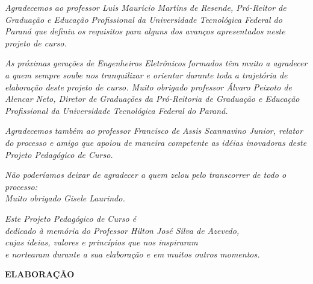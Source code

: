 {\vspace{60mm}

\textit{Agradecemos ao professor \emph{Luis Mauricio Martins de Resende}, Pró-Reitor de Graduação e Educação Profissional da Universidade Tecnológica Federal do Paraná que definiu os requisitos para alguns dos avanços apresentados neste projeto de curso.\\
}

\vspace{15mm}

\textit{As próximas gerações de Engenheiros Eletrônicos formados têm muito a agradecer a quem sempre soube nos tranquilizar e orientar durante toda a trajetória de elaboração deste projeto de curso. Muito obrigado professor \emph{Álvaro Peixoto de Alencar Neto}, Diretor de Graduações da Pró-Reitoria de Graduação e Educação Profissional da Universidade Tecnológica Federal do Paraná.}\\

\vspace{15mm}

\textit{Agradecemos também ao professor \emph{Francisco de Assis Scannavino Junior},
relator do processo e amigo que apoiou de maneira competente as idéias inovadoras
deste Projeto Pedagógico de Curso. }\\

\vspace{15mm}

\textit{Não poderíamos deixar de agradecer a quem zelou pelo transcorrer de todo o processo:\\
Muito obrigado \emph{Gisele Laurindo}. }\\

\scshape

\newpage
\thispagestyle{empty}

\vspace*{\fill}

{ \raggedleft

\textit{Este Projeto Pedagógico de Curso é \\
dedicado à memória do Professor Hilton José Silva de Azevedo, \\
cujas ideias, valores e princípios que nos inspiraram \\
e nortearam durante a sua elaboração e em muitos outros momentos.\\
}
}
\newpage
\thispagestyle{empty}

\textbf{\Large{ELABORAÇÃO}}

}
